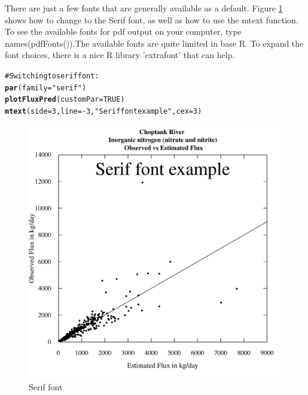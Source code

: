 \documentclass[a4paper,11pt]{article}\usepackage{graphicx, color}
\makeatletter
\newcommand{\hlfunctioncall}[1]{\textcolor[rgb]{0.501960784313725,0,0.329411764705882}{\textbf{#1}}}%
\newcommand{\hlstring}[1]{\textcolor[rgb]{0.6,0.6,1}{#1}}%
\newcommand{\hlcomment}[1]{\textcolor[rgb]{0.180392156862745,0.6,0.341176470588235}{#1}}%
\newenvironment{kframe}{%
 \def\at@end@of@kframe{}%
 \ifinner\ifhmode%
  \def\at@end@of@kframe{\end{minipage}}%
  \begin{minipage}{\columnwidth}%
 \fi\fi%
 \def\FrameCommand##1{\hskip\@totalleftmargin \hskip-\fboxsep
 \colorbox{shadecolor}{##1}\hskip-\fboxsep
     \hskip-\linewidth \hskip-\@totalleftmargin \hskip\columnwidth}%
 \MakeFramed {\advance\hsize-\width
   \@totalleftmargin\z@ \linewidth\hsize
   \@setminipage}}%
 {\par\unskip\endMakeFramed%
 \at@end@of@kframe}
\newenvironment{knitrout}{}{} %
\makeatother
\begin{document}
There are just a few fonts that are generally available as a default. Figure \ref{fig:easyFontChange} shows how to change to the Serif font, as well as how to use the mtext function. To see the available fonts for pdf output on your computer, type names(pdfFonts()).The available fonts are quite limited in base R. To expand the font choices, there is a nice R library 'extrafont' that can help.

\begin{knitrout}
\color{fgcolor}\begin{kframe}
\begin{alltt}
\hlcomment{# Switching to serif font:}
\hlfunctioncall{par}(family=\hlstring{"serif"})
\hlfunctioncall{plotFluxPred}(customPar=TRUE)
\hlfunctioncall{mtext}(side=3,line=-3,\hlstring{"Serif font example"},cex=3)
\end{alltt}
\end{kframe}\begin{figure}[]

\includegraphics[width=1\linewidth,height=1\linewidth]{figure/easyFontChange} \caption[Serif font]{Serif font\label{fig:easyFontChange}}
\end{figure}


\end{knitrout}
\end{document}
